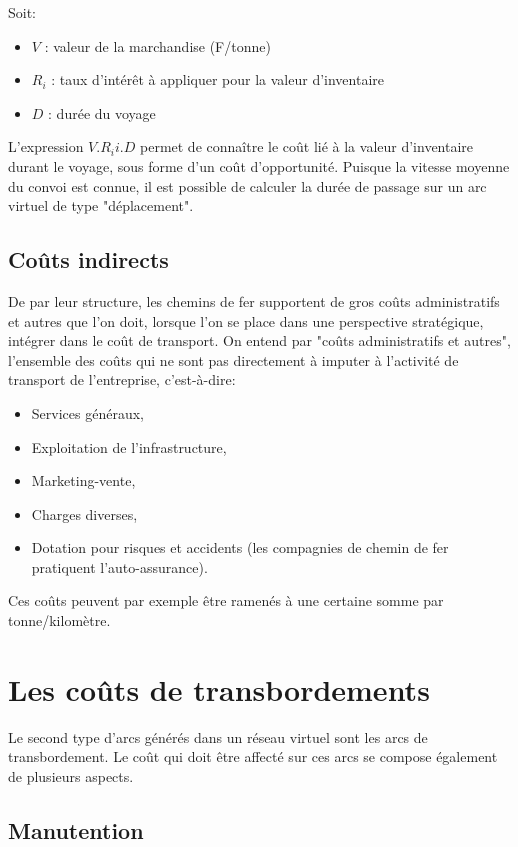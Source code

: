 Soit:
\begin{itemize}
\item $V$ : valeur de la marchandise (F/tonne)
\item $R_i$ : taux d'intérêt à appliquer pour la valeur d'inventaire
\item $D$ : durée du voyage
\end{itemize}

L'expression $V.R_ii.D$ permet de connaître le coût lié à la valeur
d'inventaire durant le voyage, sous forme d'un coût d'opportunité.
Puisque la vitesse moyenne du convoi est connue, il est possible de
calculer la durée de passage sur un arc virtuel de type
"déplacement".

\subsection{Co\^uts indirects}

De par leur structure, les chemins de fer supportent de gros coûts
administratifs et autres que l'on doit, lorsque l'on se place dans
une perspective stratégique, intégrer dans le coût de transport. On
entend par "coûts administratifs et autres", l'ensemble des coûts
qui ne sont pas directement à imputer à l'activité de transport de
l'entreprise, c'est-à-dire:

\begin{itemize}
\item Services généraux,
\item Exploitation de l'infrastructure,
\item Marketing-vente,
\item Charges diverses,
\item Dotation pour risques et accidents (les compagnies de chemin de fer
prati\-quent l'auto-assurance).
\end{itemize}

Ces coûts peuvent par exemple être ramenés à une certaine somme par
tonne/ki\-lo\-mè\-tre.

\section{Les co\^uts de transbordements}

Le second type d'arcs générés dans un réseau virtuel sont les arcs
de transbor\-dement. Le coût qui doit être affecté sur ces arcs se
compose également de plusieurs aspects.

\subsection{Manutention}

